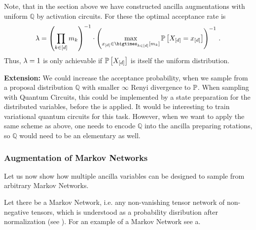 Note, that in the section above we have constructed ancilla augmentations with uniform $\mathbb{Q}$ by activation circuits.
For these the optimal acceptance rate is
\begin{align*}
    \acceptanceprob
    = \left(\prod_{\catenumeratorin}\catdimof{\catenumerator}\right)^{-1}
    \cdot \left(\max_{\shortcatindicesin} \probat{\indexedshortcatvariables}\right)^{-1} \, .
\end{align*}
Thus, $\lambda=1$ is only achievable if $\mathbb{P}\left[X_{[d]}\right]$ is itself the uniform distribution.

\textbf{Extension:}
We could increase the acceptance probability, when we sample from a proposal distribution $\mathbb{Q}$ with smaller $\infty$ Renyi divergence to $\mathbb{P}$.
When sampling with Quantum Circuits, this could be implemented by a state preparation for the distributed variables, before the \ComputationActivationCircuit{} is applied.
It would be interesting to train variational quantum circuits for this task.
However, when we want to apply the same scheme as above, one needs to encode $\mathbb{Q}$ into the ancilla preparing rotations, so $\mathbb{Q}$ would need to be an elementary \ComputationActivationNetwork{} as well.

\subsubsection{Augmentation of Markov Networks}

Let us now show how multiple ancilla variables can be designed to sample from arbitrary Markov Networks.



Let there be a Markov Network, i.e. any non-vanishing tensor network of non-negative tensors, which is understood as a probability disribution after normalization (see \cite{goessmann_tensor_2026}).
For an example of a Markov Network see a.

